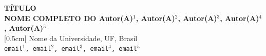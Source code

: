 \documentclass[a0,portrait]{a0poster}
\begin{document}
\onehalfspacing

\begin{minipage}[b]{1.0\linewidth} %
\begin{center}
\Huge \textbf{TÍTULO}\\
\huge \textbf{NOME COMPLETO DO Autor(A)$^{1}$, Autor(A)$^{2}$, Autor(A)$^{3}$, Autor(A)$^{4}$, Autor(A)$^{5}$}\\
[0.5cm] %
\huge Nome da Universidade, UF, Brasil\\[0.4cm] %
\texttt{email$^{1}$, email$^{2}$, email$^{3}$, email$^{4}$, email$^{5}$}\\
\end{center}
\end{minipage}
{\color{green}{\hrule height 7pt}}
%
\vspace{1cm} %
\end{document}
